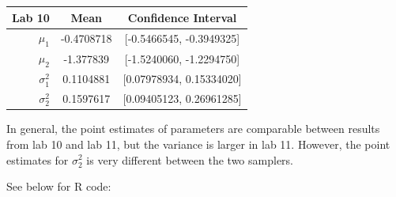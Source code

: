 \documentclass{article}
\begin{document}
\begin{enumerate}
\begin{center}
\begin{tabular}{r||c|c}
Lab 10 & Mean & Confidence Interval \\ \hline
$\mu_1$ & -0.4708718 & [-0.5466545, -0.3949325] \\ \hline
$\mu_2$ & -1.377839 & [-1.5240060, -1.2294750] \\ \hline
$\sigma_1^2$ & 0.1104881 & [0.07978934, 0.15334020] \\ \hline
$\sigma_2^2$ & 0.1597617 & [0.09405123, 0.26961285]
\end{tabular}
\end{center}
In general, the point estimates of parameters are comparable between results from lab 10 and lab 11, but the variance is larger in lab 11. However, the point estimates for $\sigma_2^2$ is very different between the two samplers.
\end{enumerate}
\pagebreak
See below for R code:
\end{document}
